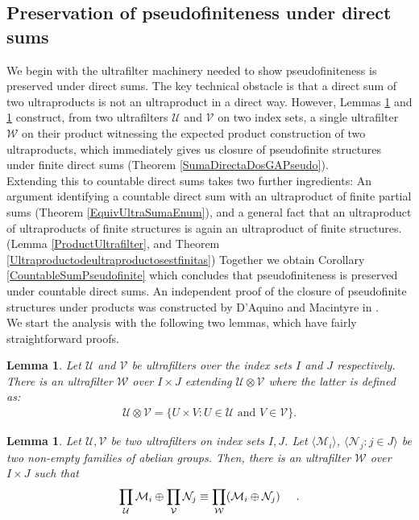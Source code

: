 \documentclass[10pt,a4paper]{amsart}
\newtheorem{lema}[prop]{Lemma}
\theoremstyle{definition}
\newcommand{\bl}{\begin{lema}}
\newcommand{\el}{\end{lema}}
\newcommand{\U}{\mathcal{U}}
\begin{document}
\subsection{Preservation of pseudofiniteness under direct sums}
\label{Subsec:PsfDirectSums}
We begin with the ultrafilter machinery needed to show pseudofiniteness is preserved under direct sums. The key technical obstacle is that a direct sum of two ultraproducts is not an ultraproduct in a direct way. However, Lemmas \ref{FilterForDirectSum} and \ref{SumTwoUltraproducts} construct, from two ultrafilters $\mathcal{U}$ and $\mathcal{V}$ on two index sets, a single ultrafilter $\mathcal{W}$ on their product witnessing the expected product construction of two ultraproducts, which immediately gives us closure of pseudofinite structures under finite direct sums (Theorem \ref{SumaDirectaDosGAPseudo}).\\

Extending this to countable direct sums takes two further ingredients: An argument identifying a countable direct sum with an ultraproduct of finite partial sums (Theorem \ref{EquivUltraSumaEnum}), and a general fact that an ultraproduct of ultraproducts of finite structures is again an ultraproduct of finite structures. (Lemma \ref{ProductUltrafilter}, and Theorem \ref{Ultraproductodeultraproductosestfinitas}) Together we obtain Corollary \ref{CountableSumPseudofinite} which concludes that pseudofiniteness is preserved under countable direct sums. An independent proof of the closure of pseudofinite structures under products was constructed by D'Aquino and Macintyre in \cite{DAquino-Macintyre2026}.\\

We start the analysis with the following two lemmas, which have fairly straightforward proofs.

\bl \label{FilterForDirectSum} Let $\U$ and $\mathcal{V}$ be ultrafilters over the index sets $I$ and $J$ respectively. There is an ultrafilter $\mathcal{W}$ over $I\times J$ extending $\mathcal{U}\otimes \mathcal{V}$ where the latter is defined as:
\begin{align*}
    \mathcal{U}\otimes \mathcal{V} = \{ U\times V : U\in\mathcal{U} \text{ and } V\in\mathcal{V}\}.
\end{align*}
\el

\bl \label{SumTwoUltraproducts} Let $\mathcal{U},\mathcal{V}$ be two ultrafilters on index sets $I,J$. Let $\langle \mathcal{M}_i\rangle$, $\langle\mathcal{N}_{j} : j\in J\rangle$ be two non-empty families of abelian groups. Then, there is an ultrafilter  $\mathcal{W}$ over $I\times J$ such that
\begin{align*}
    \prod_{\mathcal{U}}\mathcal{M}_{i} \oplus \prod_{\mathcal{V}}\mathcal{N}_{j} \equiv \prod_{\mathcal{W}}  (\mathcal{M}_{i} \oplus \mathcal{N}_{j})\hspace{0.5cm}.
\end{align*}
\el
\end{document}
